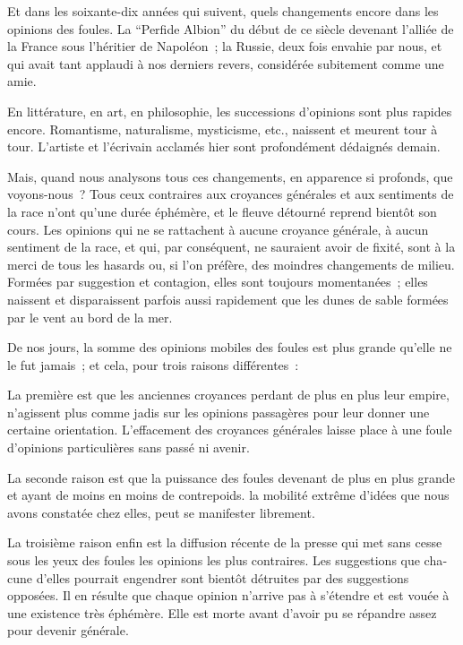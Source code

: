 \documentclass[french,twoside]{book} %
\begin{document}
Et dans les soixante-dix années qui suivent, quels changements encore dans les opinions des foules. La “Perfide Albion” du début de ce siècle devenant l’alliée de la France sous l’héritier de Napoléon ; la Russie, deux fois envahie par nous, et qui avait tant applaudi à nos derniers revers, considérée subitement comme une amie.\par
En littérature, en art, en philosophie, les successions d’opinions sont plus rapides encore. Romantisme, naturalisme, mysticisme, etc., naissent et meurent tour à tour. L’artiste et l’écrivain acclamés hier sont profondément dédaignés demain.\par
Mais, quand nous analysons tous ces changements, en apparence si profonds, que voyons-nous ? Tous ceux contraires aux croyances générales et aux sentiments de la race n’ont qu’une durée éphémère, et le fleuve détourné reprend bientôt son cours. Les opinions qui ne se rattachent à aucune croyance générale, à aucun sentiment de la race, et qui, par conséquent, ne sauraient avoir de fixité, sont à la merci de tous les hasards ou, si l’on préfère, des moindres changements de milieu. Formées par sugges­tion et contagion, elles sont toujours momentanées ; elles naissent et disparaissent parfois aussi rapidement que les dunes de sable formées par le vent au bord de la mer.\par
De nos jours, la somme des opinions mobiles des foules est plus grande qu’elle ne le fut jamais ; et cela, pour trois raisons différentes :\par
La première est que les anciennes croyances perdant de plus en plus leur empire, n’agissent plus comme jadis sur les opinions passagères pour leur donner une certaine orientation. L’effacement des croyances générales laisse place à une foule d’opinions particulières sans passé ni avenir.\par
La seconde raison est que la puissance des foules devenant de plus en plus grande et ayant de moins en moins de contrepoids. la mobilité extrême d’idées que nous avons constatée chez elles, peut se manifester librement.\par
La troisième raison enfin est la diffusion récente de la presse qui met sans cesse sous les yeux des foules les opinions les plus contraires. Les suggestions que cha­cune d’elles pourrait engendrer sont bientôt détruites par des suggestions opposées. Il en résulte que chaque opinion n’arrive pas à s’étendre et est vouée à une existence très éphémère. Elle est morte avant d’avoir pu se répandre assez pour devenir générale.\par
\end{document}
